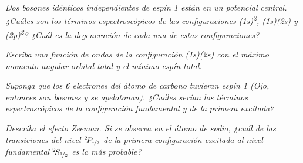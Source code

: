 \begin{tcolorbox}[halign=left]
  \emph{Dos bosones idénticos independientes de espín 1 están en un
    potencial central. ¿Cuáles son los términos espectroscópicos de
    las configuraciones (1s)\textsuperscript{2}, (1s)(2s) y
    (2p)\textsuperscript{2}? ¿Cuál es la degeneración de cada una de
    estas configuraciones?}

  \emph{Escriba una función de ondas de la configuración (1s)(2s) con
    el máximo momento angular orbital total y el mínimo espín total.}

  \emph{Suponga que los 6 electrones del átomo de carbono tuvieran
    espín 1 (Ojo, entonces son bosones y se apelotonan). ¿Cuáles serían los
    términos espectroscópicos de la configuración fundamental y de la
    primera excitada?}
\end{tcolorbox}


\begin{tcolorbox}[halign=left]
  \emph{
  Describa el efecto Zeeman. Si se observa en el átomo de sodio, ¿cuál
  de las transiciones del nivel ${}^{2}\! P_{{\nicefrac{1}{2}}}$ de la primera
  configuración excitada al nivel fundamental ${}^2\! S_{{\nicefrac{1}{2}}}$ es la
  más probable?}
\end{tcolorbox}

